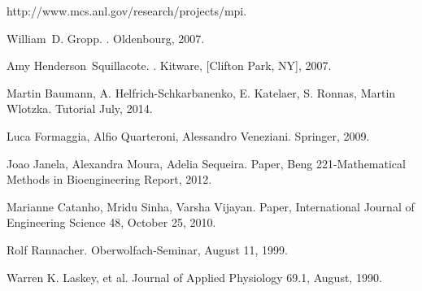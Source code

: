 \documentclass[a4paper, 11pt, twoside]{article}
\begin{document}
\begin{thebibliography}{1}

http://www.mcs.anl.gov/research/projects/mpi.

William~D. Gropp.
.
\newblock Oldenbourg, 2007.

Amy Henderson~Squillacote.
.
\newblock Kitware, [Clifton Park, NY], 2007.

Martin Baumann, A. Helfrich-Schkarbanenko, E. Katelaer, S. Ronnas, Martin Wlotzka. 
\newblock Tutorial July, 2014.

Luca Formaggia, Alfio Quarteroni, Alessandro Veneziani. 
\newblock Springer, 2009.

Joao Janela, Alexandra Moura, Adelia Sequeira. 
\newblock Paper, Beng 221-Mathematical Methods in Bioengineering Report, 2012.

Marianne Catanho, Mridu Sinha, Varsha Vijayan. 
\newblock Paper, International Journal of Engineering Science 48, October 25, 2010.

Rolf Rannacher. 
\newblock Oberwolfach-Seminar, August 11, 1999.

Warren K. Laskey, et al.
\newblock Journal of Applied Physiology 69.1, August, 1990.
\end{thebibliography}

\end{document}
